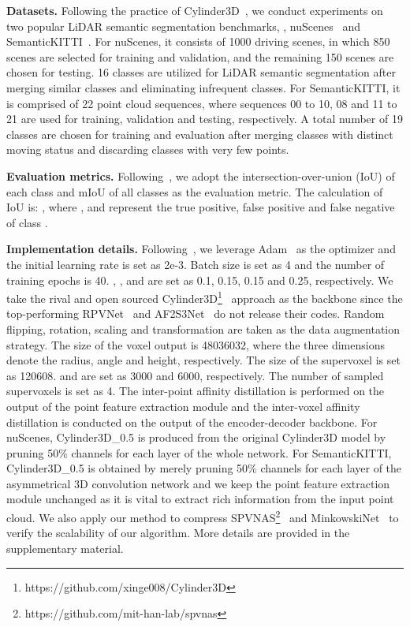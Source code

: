 

\noindent \textbf{Datasets.} Following the practice of Cylinder3D~\cite{zhu2021cylindrical}, we conduct experiments on two popular LiDAR semantic segmentation benchmarks, \ie, nuScenes~\cite{caesar2020nuscenes} and SemanticKITTI~\cite{behley2019semantickitti}. For nuScenes, it consists of 1000 driving scenes, in which 850 scenes are selected for training and validation, and the remaining 150 scenes are chosen for testing. 16 classes are utilized for LiDAR semantic segmentation after merging similar classes and eliminating infrequent classes. For SemanticKITTI, it is comprised of 22 point cloud sequences, where sequences 00 to 10, 08 and 11 to 21 are used for training, validation and testing, respectively. A total number of 19 classes are chosen for training and evaluation after merging classes with distinct moving status and discarding classes with very few points.

\noindent \textbf{Evaluation metrics.} Following~\cite{zhu2021cylindrical}, we adopt the intersection-over-union (IoU) of each class and mIoU of all classes as the evaluation metric. The calculation of IoU is: , where ,  and  represent the true positive, false positive and false negative of class .

\noindent \textbf{Implementation details.} Following~\cite{zhu2021cylindrical}, we leverage Adam~\cite{kingma2015adam} as the optimizer and the initial learning rate is set as 2e-3. Batch size is set as 4 and the number of training epochs is 40. , ,  and  are set as 0.1, 0.15, 0.15 and 0.25, respectively. We take the rival and open sourced Cylinder3D\footnote{https://github.com/xinge008/Cylinder3D}~\cite{zhu2021cylindrical} approach as the backbone since the top-performing RPVNet~\cite{Xu_2021_ICCV} and AF2S3Net~\cite{cheng20212} do not release their codes. Random flipping, rotation, scaling and transformation are taken as the data augmentation strategy. The size of the voxel output is 48036032, where the three dimensions denote the radius, angle and height, respectively. The size of the supervoxel is set as 120608.  and  are set as 3000 and 6000, respectively. The number of sampled supervoxels  is set as 4. The inter-point affinity distillation is performed on the output of the point feature extraction module and the inter-voxel affinity distillation is conducted on the output of the encoder-decoder backbone. For nuScenes, Cylinder3D\_0.5 is produced from the original Cylinder3D model by pruning 50\% channels for each layer of the whole network. For SemanticKITTI, Cylinder3D\_0.5 is obtained by merely pruning 50\% channels for each layer of the asymmetrical 3D convolution network and we keep the point feature extraction module unchanged as it is vital to extract rich information from the input point cloud. We also apply our method to compress SPVNAS\footnote{https://github.com/mit-han-lab/spvnas}~\cite{tang2020searching} and MinkowskiNet~\cite{choy20194d} to verify the scalability of our algorithm. More details are provided in the supplementary material. 

